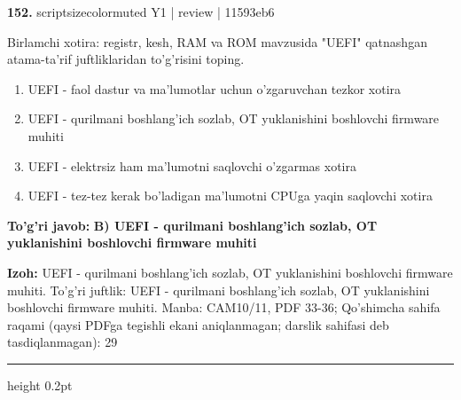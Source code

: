 \documentclass[10pt,a4paper]{article}
\begin{document}
{\bfseries\sffamily\color{ink} 152.} {scriptsizecolor{muted} Y1 | review | 11593eb6}
\par
Birlamchi xotira: registr, kesh, RAM va ROM mavzusida "UEFI" qatnashgan atama-ta'rif juftliklaridan to'g'risini toping.
\begin{enumerate}[label=\Alph*),leftmargin=9mm]
\item UEFI - faol dastur va ma'lumotlar uchun o'zgaruvchan tezkor xotira
\item UEFI - qurilmani boshlang'ich sozlab, OT yuklanishini boshlovchi firmware muhiti
\item UEFI - elektrsiz ham ma'lumotni saqlovchi o'zgarmas xotira
\item UEFI - tez-tez kerak bo'ladigan ma'lumotni CPUga yaqin saqlovchi xotira
\end{enumerate}
\begin{tcolorbox}[enhanced,breakable,colback=teal!4,colframe=teal!60!black,boxrule=0.45pt,arc=1.2mm,left=2.7mm,right=2.7mm,top=1.8mm,bottom=1.8mm,before skip=2mm,after skip=2mm]
{\bfseries\sffamily\color{teal}To'g'ri javob:} \textbf{B) UEFI - qurilmani boshlang'ich sozlab, OT yuklanishini boshlovchi firmware muhiti}
\par\smallskip
{\bfseries Izoh:} UEFI - qurilmani boshlang'ich sozlab, OT yuklanishini boshlovchi firmware muhiti. To'g'ri juftlik: UEFI - qurilmani boshlang'ich sozlab, OT yuklanishini boshlovchi firmware muhiti. Manba: CAM10/11, PDF 33-36; Qo'shimcha sahifa raqami (qaysi PDFga tegishli ekani aniqlanmagan; darslik sahifasi deb tasdiqlanmagan): 29
\end{tcolorbox}
\vspace{2mm}\hrule height 0.2pt\vspace{3mm}
\end{document}
